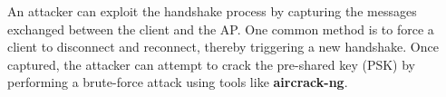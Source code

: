 An attacker can exploit the handshake process by capturing the messages exchanged between the client and the AP. One common method is to force a client to disconnect and reconnect, thereby triggering a new handshake. Once captured, the attacker can attempt to crack the pre-shared key (PSK) by performing a brute-force attack using tools like \textbf{aircrack-ng}.




